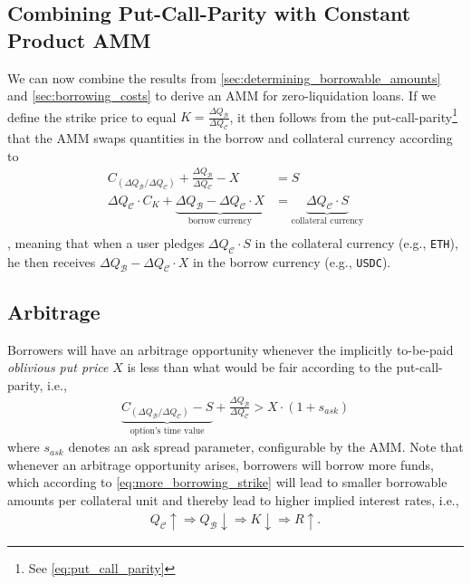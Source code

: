 \documentclass[a4paper]{article}
\begin{document}
\subsection{Combining Put-Call-Parity with Constant Product AMM}
\label{sec:combining_put_call_parity_with_AMM}
We can now combine the results from \cref{sec:determining_borrowable_amounts} and \cref{sec:borrowing_costs} to derive an AMM for zero-liquidation loans. If we define the strike price to equal $K=\frac{\Delta Q_\mathcal{B}}{\Delta Q_\mathcal{C}}$, it then follows from the put-call-parity\footnote{See \cref{eq:put_call_parity}} that the AMM swaps quantities in the borrow and collateral currency according to
\begin{equation}
\begin{split}
C_{(\Delta Q_{\mathcal{B}}/\Delta Q_\mathcal{C})} + \frac{\Delta Q_{\mathcal{B}}}{\Delta Q_{\mathcal{C}}} - X &= S \\
\Delta Q_\mathcal{C} \cdot C_{K} + \underbrace{\Delta Q_\mathcal{B} - \Delta Q_\mathcal{C} \cdot  X}_{\textrm{borrow currency}} &= \underbrace{\Delta Q_\mathcal{C} \cdot  S}_{\textrm{collateral currency}} \\
\end{split}
\end{equation}
, meaning that when a user pledges $\Delta Q_\mathcal{C} \cdot S$ in the collateral currency (e.g., \verb|ETH|), he then receives $\Delta Q_\mathcal{B} - \Delta Q_\mathcal{C} \cdot X$ in the borrow currency (e.g., \verb|USDC|).

\subsection{Arbitrage}
\label{sec:arbitrage}
Borrowers will have an arbitrage opportunity whenever the implicitly to-be-paid \emph{oblivious put price} $X$ is less than what would be fair according to the put-call-parity, i.e.,
\begin{equation}
\begin{split}
\label{eq:arbitrage_borrowers}
\underbrace{C_{(\Delta Q_\mathcal{B} / \Delta Q_\mathcal{C})} - S}_{\textrm{option's time value}} + \frac{\Delta Q_\mathcal{B}}{\Delta Q_\mathcal{C}} > X \cdot (1+s_{ask})
\end{split}
\end{equation}
where $s_{ask}$ denotes an ask spread parameter, configurable by the AMM. Note that whenever an arbitrage opportunity arises, borrowers will borrow more funds, which according to \cref{eq:more_borrowing_strike} will lead to smaller borrowable amounts per collateral unit and thereby lead to higher implied interest rates, i.e.,
\begin{equation}
\begin{split}
Q_\mathcal{C}\uparrow \Rightarrow Q_\mathcal{B}\downarrow \Rightarrow K\downarrow \Rightarrow R\uparrow.
\end{split}
\end{equation}
\end{document}
